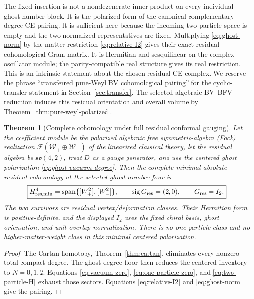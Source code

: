 \documentclass[11pt]{article}
\newtheorem{theorem}{Theorem}[section]
\theoremstyle{definition}
\theoremstyle{remark}
\newcommand{\W}{\mathcal W}
\newcommand{\F}{\mathcal F}
\begin{document}
The fixed insertion is not a nondegenerate inner product on every individual
ghost-number block.  It is the polarized form of the canonical
complementary-degree CE pairing.  It is sufficient here because the incoming
two-particle space is empty and the two normalized representatives are
fixed.  Multiplying \eqref{eq:ghost-norm} by the matter restriction
\eqref{eq:relative-I2} gives their exact residual cohomological Gram matrix.
It is Hermitian and sesquilinear on the complex oscillator module; the
parity-compatible real structure gives its real restriction.  This is an
intrinsic statement about the chosen residual CE complex.  We reserve the
phrase ``transferred pure-Weyl BV cohomological pairing'' for the
cyclic-transfer statement in Section~\ref{sec:transfer}.  The selected
algebraic BV--BFV reduction induces this residual orientation and overall
volume by Theorem~\ref{thm:pure-weyl-polarized}.

\begin{theorem}[Complete cohomology under full residual conformal gauging]\label{thm:residual-main}
Let the coefficient module be the polarized algebraic free
symmetric-algebra (Fock) realization $\F(\W_+\oplus\W_-)$ of the
linearized classical theory, let the residual algebra be
$\mathfrak{so}(4,2)$, treat $D$ as a gauge generator, and use the centered
ghost polarization \eqref{eq:ghost-vacuum-degree}.  Then the complete
minimal absolute residual cohomology at the selected ghost number four is
\begin{equation}\label{eq:main-result}
 \boxed{
 H^4_{\rm res,min}
 =\operatorname{span}\{[W_+^2],[W_-^2]\},
 \qquad \operatorname{sig}G_{\rm res}=(2,0),
 \qquad G_{\rm res}=I_2.}
\end{equation}
The two survivors are residual vertex/deformation classes.  Their Hermitian
form is positive-definite, and the displayed $I_2$ uses the fixed chiral
basis, ghost orientation, and unit-overlap normalization.  There is no
one-particle class and no higher-matter-weight class in this minimal centered
polarization.
\end{theorem}

\begin{proof}
The Cartan homotopy, Theorem~\ref{thm:cartan}, eliminates every nonzero
total compact degree.  The ghost-degree floor then reduces the centered
inventory to $N=0,1,2$.  Equations \eqref{eq:vacuum-zero},
\eqref{eq:one-particle-zero}, and \eqref{eq:two-particle-H} exhaust those
sectors.  Equations \eqref{eq:relative-I2} and \eqref{eq:ghost-norm} give the
pairing.
\end{proof}
\end{document}
